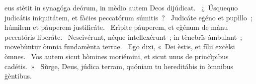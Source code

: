 { }
{%
eus stètit in synagóga deórum, in mèdio autem Deos dijúdicat. 
~¿~Úsquequo judicátis iniquitátem, et fàċies peccatórum súmitis~? 
~Judicáte eġéno et pupìllo~; húmilem et páuperem justificáte. 
~Erìpite páuperem, et eġénum de mànu peccatóris liberáte. 
~Nescivérunt, néque intellexérunt~; in tènebrïs àmbulant~; movebùntur òmnia fundamènta terrae. 
~Ego dixi, «~Dei èstis, et fílii exċèlsi òmnes. 
~Vos autem sicut hòmines moriémini, et sicut unus de prinċìpibus cadétis.~»
~Sùrge, Deus, júdica terram, quóniam tu hereditábis in òmnibus ġèntibus. 
}
